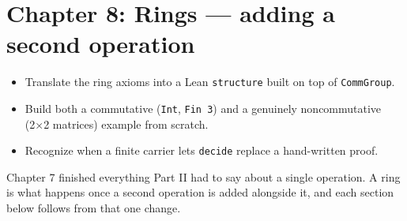 \chapter{Chapter 8: Rings --- adding a second operation}\label{sec:08-rings:00-index:1}

\begin{learningobjectives}
\begin{itemize}
\tightlist
\item
  Translate the ring axioms into a Lean \texttt{structure} built on top of \texttt{CommGroup}.
\item
  Build both a commutative (\texttt{Int}, \texttt{Fin 3}) and a genuinely noncommutative (2×2 matrices) example from scratch.
\item
  Recognize when a finite carrier lets \texttt{decide} replace a hand-written proof.
\end{itemize}
\end{learningobjectives}


Chapter 7 finished everything Part II had to say about a single operation. A ring is what happens once a second operation is added alongside it, and each section below follows from that one change.


